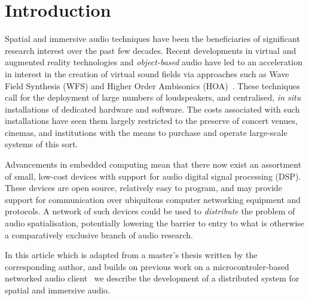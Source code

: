 \section{Introduction}\label{sec:introduction}

Spatial and immersive audio techniques have been the beneficiaries of
significant research interest over the past few decades.
Recent developments in virtual and augmented reality technologies and
\textit{object-based} audio have led to an acceleration in interest in the
creation of virtual sound fields via approaches such as Wave Field Synthesis
(WFS) and Higher Order Ambisonics (HOA)~\citep{berkhout_acoustic_1993,
    ahrens_theory_2008,daniel_further_2003,frank_producing_2015}.
These techniques call for the deployment of large numbers of loudspeakers, and
centralised, \textit{in situ} installations of dedicated hardware and software.
The costs associated with such installations have seen them largely restricted
to the preserve of concert venues, cinemas, and institutions with the means to
purchase and operate large-scale systems of this sort.

Advancements in embedded computing mean that there now exist an assortment of
small, low-cost devices with support for audio digital signal processing (DSP).
These devices are open source, relatively easy to program, and may provide
support for communication over ubiquitous computer networking equipment and
protocols.
A network of such devices could be used to \textit{distribute} the problem of
audio spatialisation, potentially lowering the barrier to entry to what is
otherwise a comparatively exclusive branch of audio research.

In this article \textemdash{} which is adapted from a master's thesis written by
the corresponding author, and builds on previous work on a microcontroler-based
networked audio client~\citep{rushton_microcontroller-based_2023} \textemdash{}
we describe the development of a distributed system for spatial and immersive
audio.



